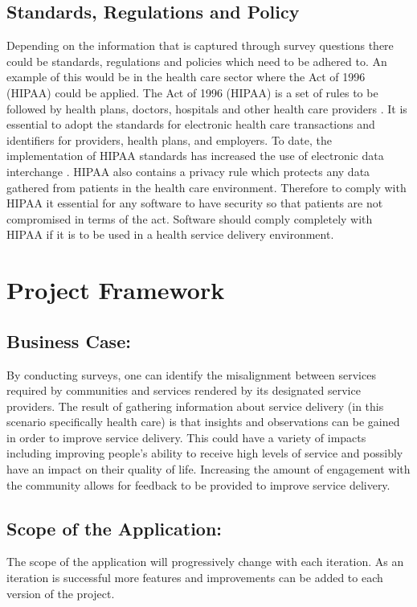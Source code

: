 \documentclass[12pt]{witseiepaper}
\begin{document}
\subsection{Standards, Regulations and Policy}
Depending on the information that is captured through survey questions there could be standards, regulations and policies which need to be adhered to. An example of this would be in the health care sector where the Act of 1996 (HIPAA) could be applied. The Act of 1996 (HIPAA) is a set of rules to be followed by health plans, doctors, hospitals and other health care providers \cite{HIPAA}. It is essential to adopt the standards for electronic health care transactions and identifiers for providers, health plans, and employers. To date, the implementation of HIPAA standards has increased the use of electronic data interchange \cite{HIPAA}. HIPAA also contains a privacy rule which protects any data gathered from patients in the health care environment. Therefore to comply with HIPAA it essential for any software to have security so that patients are not compromised in terms of the act. Software should comply completely with HIPAA if it is to be used in a health service delivery environment. \\

\section{Project Framework} 

\subsection{Business Case:} 
  
\noindent By conducting surveys, one can identify the misalignment between services required by communities and services rendered by its designated service providers. The result of gathering information about service delivery (in this scenario specifically health care) is that insights and observations can be gained in order to improve service delivery. This could have a variety of impacts including improving people's ability to receive high levels of service and possibly have an impact on their quality of life. Increasing the amount of engagement with the community allows for feedback to be provided to improve service delivery.

\subsection{Scope of the Application:}
The scope of the application will progressively change with each iteration. As an iteration is successful more features and improvements can be added to each version of the project.
\end{document}
